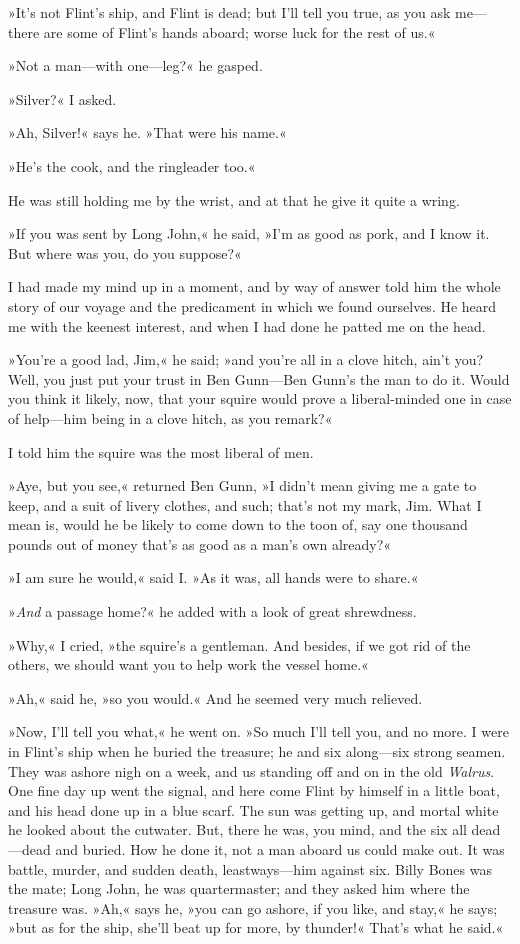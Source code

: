 »It's not Flint's ship, and Flint is dead; but I'll tell you true, as you ask me—there are some of Flint's hands aboard; worse luck for the rest of us.«

»Not a man—with one—leg?« he gasped.

»Silver?« I asked.

»Ah, Silver!« says he. »That were his name.«

»He's the cook, and the ringleader too.«

He was still holding me by the wrist, and at that he give it quite a wring.

»If you was sent by Long John,« he said, »I'm as good as pork, and I know it. But where was you, do you suppose?«

I had made my mind up in a moment, and by way of answer told him the whole story of our voyage and the predicament in which we found ourselves. He heard me with the keenest interest, and when I had done he patted me on the head.

»You're a good lad, Jim,« he said; »and you're all in a clove hitch, ain't you? Well, you just put your trust in Ben Gunn—Ben Gunn's the man to do it. Would you think it likely, now, that your squire would prove a liberal-minded one in case of help—him being in a clove hitch, as you remark?«

I told him the squire was the most liberal of men.

»Aye, but you see,« returned Ben Gunn, »I didn't mean giving me a gate to keep, and a suit of livery clothes, and such; that's not my mark, Jim. What I mean is, would he be likely to come down to the toon of, say one thousand pounds out of money that's as good as a man's own already?«

»I am sure he would,« said I. »As it was, all hands were to share.«

»\textit{And} a passage home?« he added with a look of great shrewdness.

»Why,« I cried, »the squire's a gentleman. And besides, if we got rid of the others, we should want you to help work the vessel home.«

»Ah,« said he, »so you would.« And he seemed very much relieved.

»Now, I'll tell you what,« he went on. »So much I'll tell you, and no more. I were in Flint's ship when he buried the treasure; he and six along—six strong seamen. They was ashore nigh on a week, and us standing off and on in the old \textit{Walrus}. One fine day up went the signal, and here come Flint by himself in a little boat, and his head done up in a blue scarf. The sun was getting up, and mortal white he looked about the cutwater. But, there he was, you mind, and the six all dead—dead and buried. How he done it, not a man aboard us could make out. It was battle, murder, and sudden death, leastways—him against six. Billy Bones was the mate; Long John, he was quartermaster; and they asked him where the treasure was. »Ah,« says he, »you can go ashore, if you like, and stay,« he says; »but as for the ship, she'll beat up for more, by thunder!« That's what he said.«

